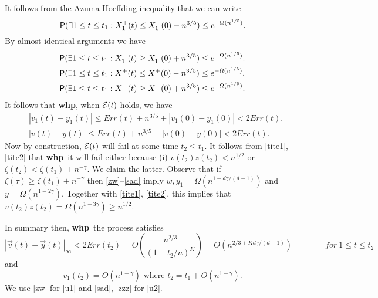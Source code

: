 \documentclass[11pt]{article}
\def\cE{{\cal E}}
\def\g{\gamma}
\def\z{\zeta}
\def\t{\tau}
\def\whp{{\bf whp}}
\def\Pr{{\sf P}}
\newcommand{\ignore}[1]{}
\def\vv{\vec{v}}
\def\yy{\vec{y}}
\newcommand{\brac}[1]{\left(#1\right)}
\newcommand{\bfrac}[2]{\brac{\frac{#1}{#2}}}
\newcommand{\beq}[1]{\begin{equation}\label{#1}}
\newcommand{\eeq}{\end{equation}}
\begin{document}
It follows from the Azuma-Hoeffding inequality that we can write
$$\Pr(\exists 1\leq t\leq t_1:X_1^+(t)\leq X_1^+(0)-n^{3/5})\leq e^{-\Omega(n^{1/5})}.$$
By almost identical arguments we have
\begin{align*}
&\Pr(\exists 1\leq t\leq t_1:X_1^-(t)\geq X_1^-(0)+n^{3/5})\leq e^{-\Omega(n^{1/5})}.\\
&\Pr(\exists 1\leq t\leq t_1:X^+(t)\leq X^+(0)-n^{3/5})\leq e^{-\Omega(n^{1/5})}.\\
&\Pr(\exists 1\leq t\leq t_1:X^-(t)\geq X^-(0)+n^{3/5})\leq e^{-\Omega(n^{1/5})}.\\
\end{align*}
It follows that \whp, when $\cE(t)$ holds, we have
\begin{align}
&|v_1(t)-y_1(t)|\leq Err(t)+n^{3/5}+|v_1(0)-y_1(0)|<2Err(t).\label{tite1}\\
&|v(t)-y(t)|\leq Err(t)+n^{3/5}+|v(0)-y(0)|<2Err(t).\label{tite2}
\end{align}
Now by construction, $\cE(t)$ will fail at some time $t_2\leq t_1$. It follows from \eqref{tite1}, \eqref{tite2} that \whp\ 
it will fail either because (i) $v(t_2)z(t_2)<n^{1/2}$ or $\z(t_2)<\z(t_1)+n^{-\g}$. We claim the latter.
Observe that if $\z(\t)\geq \z(t_1)+n^{-\g}$ then \eqref{zw}--\eqref{sad} imply $w,y_1=\Omega(n^{1-d\g/(d-1)})$ and
$y=\Omega(n^{1-2\g})$. Together with \eqref{tite1}, \eqref{tite2}, this implies that $v(t_2)z(t_2)=\Omega(n^{1-3\g})
\geq n^{1/2}$.

In summary then, \whp\, the process satisfies
\beq{u1}
|\vv(t)-\yy(t)|_\infty<2Err(t_2)=O\bfrac{n^{2/3}}{(1-t_2/n)^K}=O(n^{2/3+Kd\g/(d-1)}) \qquad\qquad for\ 1\leq t\leq t_2
\eeq
and
\beq{u2}
v_1(t_2)=O(n^{1-\g})\text{ where }t_2=t_1+O(n^{1-\g}).
\eeq
We use \eqref{zw} for \eqref{u1} and \eqref{sad}, \eqref{zzz} for \eqref{u2}.


\ignore{
\section{Growth of $v_1$}
When $v_1$ is small, we see that \eqref{dv1} becomes
$$\frac{dv_1}{dt} = -1  + \frac{d-1}{dw}\frac{vz^2}{f(z)}=-1+\frac{(d-1)z}{e^z-1}$$
after substituting for $dw$ using \eqref{actual}.

This is positive for small $z$. This is because our differential equations are only good for Phase 1.
In Phase 2, vertices on the left lose edges. I think we observed this already. To handle Karp-Sipser in
Phase 2 we need to keep track of the number of vertices on the left with degree $j$ for $2\leq j\leq d$. So we
need $d-1$ variables $v,v_{j,left},j=2,\ldots,d$ and $d-1+2$ equations where the extra two equations are needed to keep track of the growth of
$v_1$ and $v_{1,left}$.
}
\end{document}
